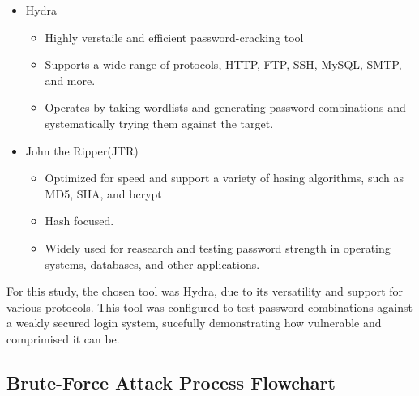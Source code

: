 \documentclass{comjnl}
\begin{document}
\begin{itemize}
  \item Hydra
  \begin{itemize}
    \item Highly verstaile and efficient password-cracking tool
    \item Supports a wide range of protocols, HTTP, FTP, SSH, MySQL, SMTP, and more.
    \item Operates by taking wordlists and generating password combinations and systematically trying them against the target.
  \end{itemize}  
  \item John the Ripper(JTR)
  \begin{itemize}
    \item Optimized for speed and support a variety of hasing algorithms, such as MD5, SHA, and bcrypt
    \item Hash focused.
    \item Widely used for reasearch and testing password strength in operating systems, databases, and other applications.
  \end{itemize}
\end{itemize}

For this study, the chosen tool was Hydra, due to its versatility and support for various protocols. This tool was configured to test password combinations against a weakly secured login system, sucefully demonstrating how vulnerable and comprimised it can be.

\subsection{Brute-Force Attack Process Flowchart}

\end{document}
